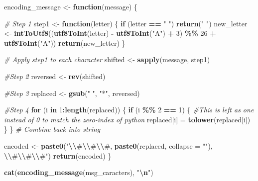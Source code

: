 \documentclass[
]{article}
\newenvironment{Shaded}{\begin{snugshade}}{\end{snugshade}}
\newcommand{\AttributeTok}[1]{\textcolor[rgb]{0.13,0.29,0.53}{#1}}
\newcommand{\CommentTok}[1]{\textcolor[rgb]{0.56,0.35,0.01}{\textit{#1}}}
\newcommand{\ControlFlowTok}[1]{\textcolor[rgb]{0.13,0.29,0.53}{\textbf{#1}}}
\newcommand{\DecValTok}[1]{\textcolor[rgb]{0.00,0.00,0.81}{#1}}
\newcommand{\FunctionTok}[1]{\textcolor[rgb]{0.13,0.29,0.53}{\textbf{#1}}}
\newcommand{\NormalTok}[1]{#1}
\newcommand{\OtherTok}[1]{\textcolor[rgb]{0.56,0.35,0.01}{#1}}
\newcommand{\SpecialCharTok}[1]{\textcolor[rgb]{0.81,0.36,0.00}{\textbf{#1}}}
\newcommand{\StringTok}[1]{\textcolor[rgb]{0.31,0.60,0.02}{#1}}
\begin{document}
\begin{Shaded}
\begin{Highlighting}[]
\NormalTok{encoding\_message }\OtherTok{\textless{}{-}} \ControlFlowTok{function}\NormalTok{(message) \{}
  
  \CommentTok{\# Step 1}
\NormalTok{  step1 }\OtherTok{\textless{}{-}} \ControlFlowTok{function}\NormalTok{(letter) \{}
    \ControlFlowTok{if}\NormalTok{ (letter }\SpecialCharTok{==} \StringTok{" "}\NormalTok{) }\FunctionTok{return}\NormalTok{(}\StringTok{" "}\NormalTok{)}
\NormalTok{    new\_letter }\OtherTok{\textless{}{-}} \FunctionTok{intToUtf8}\NormalTok{((}\FunctionTok{utf8ToInt}\NormalTok{(letter) }\SpecialCharTok{{-}} \FunctionTok{utf8ToInt}\NormalTok{(}\StringTok{"A"}\NormalTok{) }\SpecialCharTok{+} \DecValTok{3}\NormalTok{) }\SpecialCharTok{\%\%} \DecValTok{26} \SpecialCharTok{+} \FunctionTok{utf8ToInt}\NormalTok{(}\StringTok{"A"}\NormalTok{))}
    \FunctionTok{return}\NormalTok{(new\_letter)}
\NormalTok{  \}}
  
  \CommentTok{\# Apply step1 to each character}
\NormalTok{  shifted }\OtherTok{\textless{}{-}} \FunctionTok{sapply}\NormalTok{(message, step1)}
  
  \CommentTok{\#Step 2}
\NormalTok{  reversed }\OtherTok{\textless{}{-}} \FunctionTok{rev}\NormalTok{(shifted)}
  
  \CommentTok{\#Step 3}
\NormalTok{  replaced }\OtherTok{\textless{}{-}} \FunctionTok{gsub}\NormalTok{(}\StringTok{" "}\NormalTok{, }\StringTok{"*"}\NormalTok{, reversed)}
  
  \CommentTok{\#Step 4}
  \ControlFlowTok{for}\NormalTok{ (i }\ControlFlowTok{in} \DecValTok{1}\SpecialCharTok{:}\FunctionTok{length}\NormalTok{(replaced)) \{}
    \ControlFlowTok{if}\NormalTok{ (i }\SpecialCharTok{\%\%} \DecValTok{2} \SpecialCharTok{==} \DecValTok{1}\NormalTok{) \{     }\CommentTok{\#This is left as one instead of 0 to match the zero{-}index of python}
\NormalTok{      replaced[i] }\OtherTok{=} \FunctionTok{tolower}\NormalTok{(replaced[i])}
\NormalTok{      \}}
\NormalTok{    \}}
  \CommentTok{\# Combine back into string}
  
\NormalTok{  encoded }\OtherTok{\textless{}{-}} \FunctionTok{paste0}\NormalTok{(}\StringTok{\textquotesingle{}"}\SpecialCharTok{\textbackslash{}\textbackslash{}}\StringTok{\#}\SpecialCharTok{\textbackslash{}\textbackslash{}}\StringTok{\#}\SpecialCharTok{\textbackslash{}\textbackslash{}}\StringTok{\#\textquotesingle{}}\NormalTok{, }\FunctionTok{paste0}\NormalTok{(replaced, }\AttributeTok{collapse =} \StringTok{""}\NormalTok{), }\StringTok{\textquotesingle{}}\SpecialCharTok{\textbackslash{}\textbackslash{}}\StringTok{\#}\SpecialCharTok{\textbackslash{}\textbackslash{}}\StringTok{\#}\SpecialCharTok{\textbackslash{}\textbackslash{}}\StringTok{\#"\textquotesingle{}}\NormalTok{)}
  \FunctionTok{return}\NormalTok{(encoded)}
\NormalTok{\}}

\FunctionTok{cat}\NormalTok{(}\FunctionTok{encoding\_message}\NormalTok{(msg\_caracters), }\StringTok{"}\SpecialCharTok{\textbackslash{}n}\StringTok{"}\NormalTok{)}
\end{Highlighting}
\end{Shaded}
\end{document}
